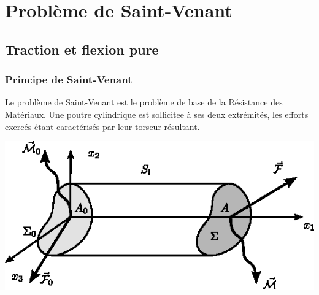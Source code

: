 \chapter{Problème de Saint-Venant} \label{chap:Ch07} 
\section{Traction et flexion pure} \label{sec:Ch07-1}
\subsection{Principe de Saint-Venant} \label{ssec:Ch07-1.1}
Le problème de Saint-Venant est le problème de base de la Résistance des Matériaux.
Une poutre cylindrique est sollicitee à ses deux extrémités, les efforts exercés étant caractérisés par leur torseur résultant.

\begin{center}
\includegraphics{../images/T1_Ch07-01}
\end{center}

